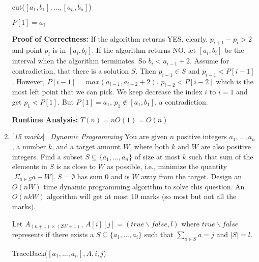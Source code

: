 \documentclass[11pt]{article}
\newcommand{\Q}[1]{\medskip\item {[{\em #1 marks\/}]}\ }
\begin{document}
\begin{enumerate}
\begin{algorithm}[h]
    \caption{cut($[a_1, b_1], \dots, [a_n, b_n]$)}
    $P[1] = a_1$\\
\end{algorithm}

\textbf{Proof of Correctness:} If the algorithm returns YES, clearly, $p_{i + 1} - p_i > 2$ and point $p_i$ is 
in $[a_i, b_i]$. If the algorithm returns NO, let $[a_i, b_i]$ be the interval when the algorithm terminates. 
So $b_i < a_{i - 1} + 2$. Assume for contradiction, that there is a solution $S$. Then $p_{i - 1} \in S$ and 
$p_{i - 1} < P[i - 1]$. However, $P[i - 1] = max(a_{i - 1}, a_{i - 2} + 2)$. $p_{i - 2} < P[i - 2]$ which 
is the most left point that we can pick.
We keep decrease the index $i$ to $i = 1$ and get $p_1 < P[1]$. But $P[1] = a_1$, $p_1 \notin [a_1, b_1]$, 
a contradiction.

\textbf{Runtime Analysis:} $T(n) = n O(1) = O(n)$

\newpage
\Q{15} {\em Dynamic Programming } You are given $n$ positive integers $a_1, ..., a_n$, a number $k$, and a target amount $W$, where both $k$ and $W$ are also positive integers. Find a subset $S \subseteq \{a_1, ..., a_n\}$ of size at most $k$ such that sum of the elements in $S$ is as close to $W$ as possible, i.e., minimize the quantity $|\Sigma_{a \in S} a - W|$. $S=\emptyset$ has sum 0 and is $W$ away from the target.  Design an $O(nW)$ time dynamic programming algorithm to solve this question. An $O(nkW)$ algorithm will get at most 10 marks (so most but not all the marks).

Let $A_{(n + 1) \times (2W + 1)}$, $A[i][j] = (true \backslash false, l)$ where $true \backslash false$ 
represents if there exists a $S \subseteq \{a_1, ..., a_i\}$ such that $\sum_{a \in S} a = j$ and 
$\lvert S \rvert = l$.

\begin{algorithm} [h]
    \caption{TraceBack($[a_1, \dots, a_n], A, i, j$)}
\end{algorithm} 


\end{enumerate}
\end{document}
